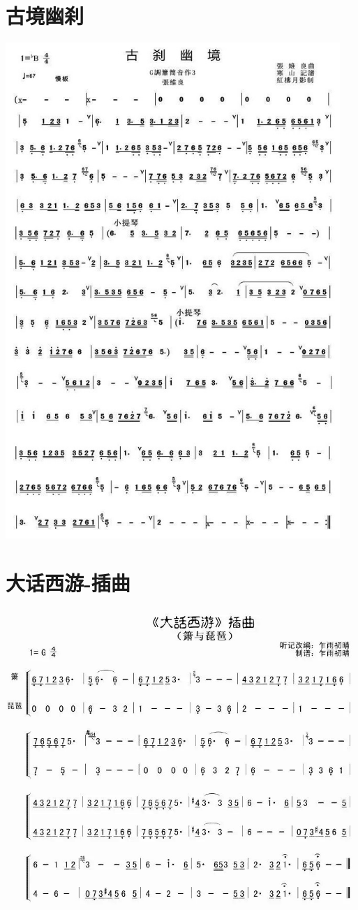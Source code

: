 \documentclass[cn,pad,twocol]{elegantbook}
\begin{document}
\section{古境幽刹}\includegraphics[width=0.95\textwidth]{dongxiao/20200819/古刹幽境.jpeg}
\section{大话西游-插曲}\includegraphics[width=\textwidth]{dongxiao/20200819/大话西游插曲.jpeg}
\end{document}
